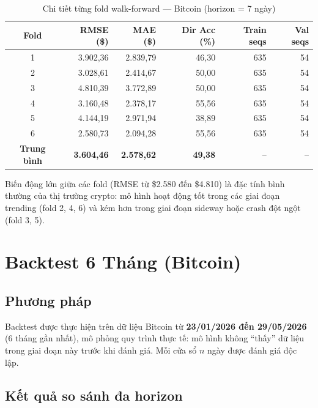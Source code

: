 \documentclass[12pt, a4paper]{report}
\begin{document}
\begin{table}[H]
  \centering
  \caption{Chi tiết từng fold walk-forward --- Bitcoin (horizon = 7 ngày)}
  \label{tab:wf_fold_btc}
  \begin{tabular}{crrrrr}
    \toprule
    Fold & RMSE (\$) & MAE (\$) & Dir Acc (\%) & Train seqs & Val seqs \\
    \midrule
    1 & 3.902,36 & 2.839,79 & 46,30 & 635 & 54 \\
    2 & 3.028,61 & 2.414,67 & 50,00 & 635 & 54 \\
    3 & 4.810,39 & 3.772,89 & 50,00 & 635 & 54 \\
    4 & 3.160,48 & 2.378,17 & 55,56 & 635 & 54 \\
    5 & 4.144,19 & 2.971,94 & 38,89 & 635 & 54 \\
    6 & 2.580,73 & 2.094,28 & 55,56 & 635 & 54 \\
    \midrule
    \textbf{Trung bình} & \textbf{3.604,46} & \textbf{2.578,62} & \textbf{49,38} & -- & -- \\
    \bottomrule
  \end{tabular}
\end{table}

Biến động lớn giữa các fold (RMSE từ \$2.580 đến \$4.810) là đặc tính bình thường của
thị trường crypto: mô hình hoạt động tốt trong các giai đoạn trending (fold 2, 4, 6) và
kém hơn trong giai đoạn sideway hoặc crash đột ngột (fold 3, 5).

\section{Backtest 6 Tháng (Bitcoin)}

\subsection{Phương pháp}

Backtest được thực hiện trên dữ liệu Bitcoin từ \textbf{23/01/2026 đến 29/05/2026}
(6 tháng gần nhất), mô phỏng quy trình thực tế: mô hình không ``thấy'' dữ liệu trong
giai đoạn này trước khi đánh giá. Mỗi cửa sổ $n$ ngày được đánh giá độc lập.

\subsection{Kết quả so sánh đa horizon}
\end{document}
